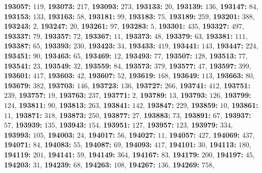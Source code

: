 \textsf{\bfseries 193057:} $119$, \textsf{\bfseries 193073:} $217$, \textsf{\bfseries 193093:} $273$, \textsf{\bfseries 193133:} $20$, \textsf{\bfseries 193139:} $136$, \textsf{\bfseries 193147:} $84$, \textsf{\bfseries 193153:} $133$, \textsf{\bfseries 193163:} $58$, \textsf{\bfseries 193181:} $99$, \textsf{\bfseries 193183:} $75$, \textsf{\bfseries 193189:} $259$, \textsf{\bfseries 193201:} $388$, \textsf{\bfseries 193243:} $2$, \textsf{\bfseries 193247:} $20$, \textsf{\bfseries 193261:} $97$, \textsf{\bfseries 193283:} $5$, \textsf{\bfseries 193301:} $435$, \textsf{\bfseries 193327:} $497$, \textsf{\bfseries 193337:} $79$, \textsf{\bfseries 193357:} $72$, \textsf{\bfseries 193367:} $11$, \textsf{\bfseries 193373:} $48$, \textsf{\bfseries 193379:} $63$, \textsf{\bfseries 193381:} $111$, \textsf{\bfseries 193387:} $65$, \textsf{\bfseries 193393:} $230$, \textsf{\bfseries 193423:} $34$, \textsf{\bfseries 193433:} $419$, \textsf{\bfseries 193441:} $143$, \textsf{\bfseries 193447:} $224$, \textsf{\bfseries 193451:} $90$, \textsf{\bfseries 193463:} $65$, \textsf{\bfseries 193469:} $12$, \textsf{\bfseries 193493:} $77$, \textsf{\bfseries 193507:} $128$, \textsf{\bfseries 193513:} $77$, \textsf{\bfseries 193541:} $23$, \textsf{\bfseries 193549:} $32$, \textsf{\bfseries 193559:} $84$, \textsf{\bfseries 193573:} $379$, \textsf{\bfseries 193577:} $47$, \textsf{\bfseries 193597:} $399$, \textsf{\bfseries 193601:} $417$, \textsf{\bfseries 193603:} $42$, \textsf{\bfseries 193607:} $52$, \textsf{\bfseries 193619:} $168$, \textsf{\bfseries 193649:} $113$, \textsf{\bfseries 193663:} $80$, \textsf{\bfseries 193679:} $382$, \textsf{\bfseries 193703:} $146$, \textsf{\bfseries 193723:} $136$, \textsf{\bfseries 193727:} $266$, \textsf{\bfseries 193741:} $412$, \textsf{\bfseries 193751:} $239$, \textsf{\bfseries 193757:} $19$, \textsf{\bfseries 193763:} $237$, \textsf{\bfseries 193771:} $2$, \textsf{\bfseries 193789:} $13$, \textsf{\bfseries 193793:} $126$, \textsf{\bfseries 193799:} $124$, \textsf{\bfseries 193811:} $90$, \textsf{\bfseries 193813:} $263$, \textsf{\bfseries 193841:} $142$, \textsf{\bfseries 193847:} $229$, \textsf{\bfseries 193859:} $10$, \textsf{\bfseries 193861:} $11$, \textsf{\bfseries 193871:} $318$, \textsf{\bfseries 193873:} $250$, \textsf{\bfseries 193877:} $27$, \textsf{\bfseries 193883:} $73$, \textsf{\bfseries 193891:} $67$, \textsf{\bfseries 193937:} $57$, \textsf{\bfseries 193939:} $135$, \textsf{\bfseries 193943:} $154$, \textsf{\bfseries 193951:} $127$, \textsf{\bfseries 193957:} $123$, \textsf{\bfseries 193979:} $334$, \textsf{\bfseries 193993:} $105$, \textsf{\bfseries 194003:} $24$, \textsf{\bfseries 194017:} $56$, \textsf{\bfseries 194027:} $11$, \textsf{\bfseries 194057:} $427$, \textsf{\bfseries 194069:} $437$, \textsf{\bfseries 194071:} $84$, \textsf{\bfseries 194083:} $55$, \textsf{\bfseries 194087:} $69$, \textsf{\bfseries 194093:} $417$, \textsf{\bfseries 194101:} $30$, \textsf{\bfseries 194113:} $180$, \textsf{\bfseries 194119:} $201$, \textsf{\bfseries 194141:} $59$, \textsf{\bfseries 194149:} $364$, \textsf{\bfseries 194167:} $83$, \textsf{\bfseries 194179:} $200$, \textsf{\bfseries 194197:} $45$, \textsf{\bfseries 194203:} $31$, \textsf{\bfseries 194239:} $68$, \textsf{\bfseries 194263:} $108$, \textsf{\bfseries 194267:} $136$, \textsf{\bfseries 194269:} $758$, 
